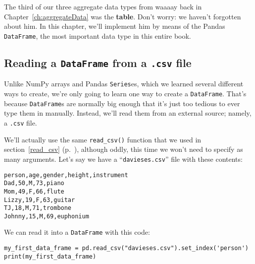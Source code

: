 
\chapter[Tables in Python (1 of 3)]{\huge\selectfont{Tables in Python (1 of
3)}}

\label{dataframes}


The third of our three aggregate data types from waaaay back in
Chapter~\ref{ch:aggregateData} was the \textbf{table}. Don't worry: we haven't
forgotten about him. In this chapter, we'll implement him by means of the
Pandas \texttt{DataFrame}, the most important data type in this entire book.

\section{Reading a \texttt{DataFrame} from a \texttt{.csv} file}


Unlike NumPy arrays and Pandas \texttt{Series}es, which we learned several
different ways to create, we're only going to learn one way to create a
\texttt{DataFrame}. That's because \texttt{DataFrame}s are normally big enough
that it's just too tedious to ever type them in manually. Instead, we'll read
them from an external source; namely, a \texttt{.csv} file.


We'll actually use the same \texttt{read\_csv()} function that we used in
section~\ref{read_csv} (p.~\pageref{read_csv}), although oddly, this time we
won't need to specify as many arguments. Let's say we have a
``\texttt{davieses.csv}'' file with these contents:


\begin{Verbatim}[fontsize=\small,samepage=true,frame=lines,framesep=3mm]
person,age,gender,height,instrument
Dad,50,M,73,piano
Mom,49,F,66,flute
Lizzy,19,F,63,guitar
TJ,18,M,71,trombone
Johnny,15,M,69,euphonium
\end{Verbatim}

We can read it into a \texttt{DataFrame} with this code:

\begin{Verbatim}[fontsize=\small,samepage=true,frame=single,framesep=3mm]
my_first_data_frame = pd.read_csv("davieses.csv").set_index('person')
print(my_first_data_frame)
\end{Verbatim}
\vspace{-.2in}


